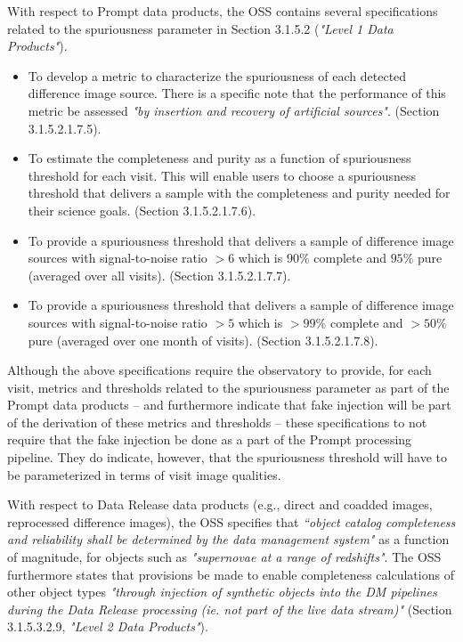 \documentclass[DM,lsstdraft,toc]{lsstdoc}
\begin{document}
With respect to Prompt data products, the OSS  contains several specifications related to the spuriousness parameter in Section 3.1.5.2 ({\it "Level 1 Data Products"}).
\begin{itemize}
\item To develop a metric to characterize the spuriousness of each detected difference image source. There is a specific note that the performance of this metric be assessed {\it "by insertion and recovery of artificial sources"}. (Section 3.1.5.2.1.7.5). 
\item To estimate the completeness and purity as a function of spuriousness threshold for each visit. This will enable users to choose a spuriousness threshold that delivers a sample with the completeness and purity needed for their science goals. (Section 3.1.5.2.1.7.6).
\item To provide a spuriousness threshold that delivers a sample of difference image sources with signal-to-noise ratio $>6$ which is $90\%$ complete and $95\%$ pure (averaged over all visits). (Section 3.1.5.2.1.7.7).
\item To provide a spuriousness threshold that delivers a sample of difference image sources with signal-to-noise ratio $>5$ which is $>99\%$ complete and $>50\%$ pure (averaged over one month of visits). (Section 3.1.5.2.1.7.8).
\end{itemize}

Although the above specifications require the observatory to provide, for each visit, metrics and thresholds related to the spuriousness parameter as part of the Prompt data products -- and furthermore indicate that fake injection will be part of the derivation of these metrics and thresholds -- these specifications to not require that the fake injection be done as a part of the Prompt processing pipeline. They do indicate, however, that the spuriousness threshold will have to be parameterized in terms of visit image qualities.

With respect to Data Release data products (e.g., direct and coadded images, reprocessed difference images), the OSS specifies that {\it ``object catalog completeness and reliability shall be determined by the data management system"} as a function of magnitude, for objects such as {\it "supernovae at a range of redshifts"}. The OSS furthermore states that provisions be made to enable completeness calculations of other object types {\it "through injection of synthetic objects into the DM pipelines during the Data Release processing (ie. not part of the live data stream)"} (Section 3.1.5.3.2.9, {\it "Level 2 Data Products"}).
\end{document}
